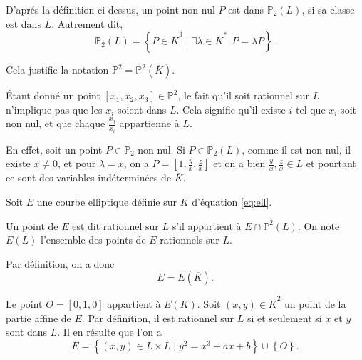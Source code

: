 D'aprés la définition ci-dessus, un point non nul $P$ est dans $\mathbb{P}_{2}(L)$, si sa classe est dans $L$. Autrement
dit, 
\[
\mathbb{P}_{2}(L)=\left\{ P \in \overline{K}^{3} \mid \exists \lambda \in \overline{K}^{*}, P =
\lambda P\right\} 
.\] 

Cela justifie la notation $\mathbb{P}^2 = \mathbb{P}^2(\overline{K})$.

\begin{remarque}
    Étant donné un point $[x_1,x_2,x_3] \in \mathbb{P}^2$, le fait qu'il soit rationnel sur $L$ n'implique pas que les $x_{i}$ soient dans $L$. Cela signifie qu'il existe $i$ tel que $x_{i}$ soit non nul, et que chaque $\frac{x_{j}}{x_{i}}$ appartienne à $L$.

    En effet, soit un point $P \in \mathbb{P}_{2}$ non nul. Si $P \in \mathbb{P}_{2}(L)$,
    comme il est non nul, il existe $x \neq 0$, et pour $\lambda = x$, on a $P =
    [1,\frac{y}{x},\frac{z}{x}]$ et on a bien $\frac{y}{x},\frac{z}{x} \in L$ et pourtant ce
    sont des variables indéterminées de $\overline{K}$.
\end{remarque}

Soit $E$ une courbe elliptique définie sur $K$ d'équation \eqref{eq:ell}.

\begin{definition}
    Un point de $E$ est dit rationnel sur $L$ s'il appartient à $E \cap \mathbb{P}^2(L)$. On note $E(L)$ l'ensemble des points de $E$ rationnels sur $L$.
\end{definition}


Par définition, on a donc
\[
E = E(\overline{K})
.\] 

Le point $O = [0,1,0]$ appartient à $E(K)$. Soit $(x,y) \in \overline{K}^2$ un point de la partie affine de $E$. Par définition, il est rationnel sur $L$ si et seulement si $x$ et $y$ sont dans $L$. Il en résulte que l'on a 
\[
E = \left\{ (x,y) \in L \times L \mid y^2 = x^3+ax+b \right\} \cup \left\{ O \right\} 
.\] 

